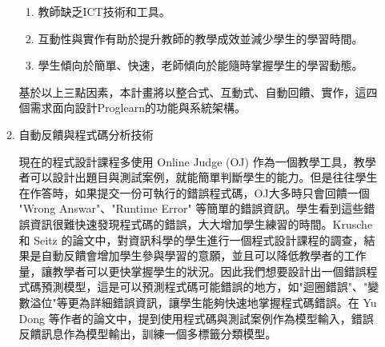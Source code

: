 \documentclass[12pt]{article}
\begin{document}
\begin{enumerate}
\begin{enumerate}
        \begin{enumerate}
          \item 教師缺乏ICT技術和工具。
          \item 互動性與實作有助於提升教師的教學成效並減少學生的學習時間。
          \item 學生傾向於簡單、快速，老師傾向於能隨時掌握學生的學習動態。
        \end{enumerate}
        \par 基於以上三點因素，本計畫將以整合式、互動式、自動回饋、實作，這四個需求面向設計Proglearn的功能與系統架構。
      \item 自動反饋與程式碼分析技術
        \par 現在的程式設計課程多使用 Online Judge (OJ) 作為一個教學工具，教學者可以設計出題目與測試案例，就能簡單判斷學生的能力。但是往往學生在作答時，如果提交一份可執行的錯誤程式碼，OJ大多時只會回饋一個 "Wrong Answar"、"Runtime Error" 等簡單的錯誤資訊。學生看到這些錯誤資訊很難快速發現程式碼的錯誤，大大增加學生練習的時間。Krusche 和 Seitz 的論文中，對資訊科學的學生進行一個程式設計課程的調查，結果是自動反饋會增加學生參與學習的意願，並且可以降低教學者的工作量，讓教學者可以更快掌握學生的狀況。因此我們想要設計出一個錯誤程式碼預測模型，這是可以預測程式碼可能錯誤的地方，如"迴圈錯誤"、"變數溢位"等更為詳細錯誤資訊，讓學生能夠快速地掌握程式碼錯誤。在 Yu Dong 等作者的論文中，提到使用程式碼與測試案例作為模型輸入，錯誤反饋訊息作為模型輸出，訓練一個多標籤分類模型。
    \end{enumerate}


\end{enumerate}
\end{document}
